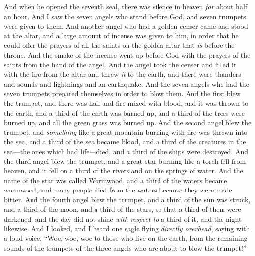 \begin{biblechapter} %
 And when he opened the seventh seal, there was silence in heaven \textit{for} about half an hour.
\verse And I saw the seven angels who stand before God, and seven trumpets were given to them.
\verse And another angel who had a golden censer came and stood at the altar, and a large amount of incense was given to him, in order that he could offer the prayers of all the saints on the golden altar that \textit{is} before the throne.
\verse And the smoke of the incense went up before God with the prayers of the saints from the hand of the angel.
\verse And the angel took the censer and filled it with the fire from the altar and threw \textit{it} to the earth, and there were thunders and sounds and lightnings and an earthquake.
 And the seven angels who had the seven trumpets prepared themselves in order to blow them.
\verse And the first blew the trumpet, and there was hail and fire mixed with blood, and it was thrown to the earth, and a third of the earth was burned up, and a third of the trees were burned up, and all the green grass was burned up.
\verse And the second angel blew the trumpet, and \textit{something} like a great mountain burning with fire was thrown into the sea, and a third of the sea became blood,
\verse and a third of the creatures in the sea—the ones which had life—died, and a third of the ships were destroyed.
\verse And the third angel blew the trumpet, and a great star burning like a torch fell from heaven, and it fell on a third of the rivers and on the springs of water.
\verse And the name of the star was called Wormwood, and a third of the waters became wormwood, and many people died from the waters because they were made bitter.
\verse And the fourth angel blew the trumpet, and a third of the sun was struck, and a third of the moon, and a third of the stars, so that a third of them were darkened, and the day did not shine \textit{with respect to} a third of it, and the night likewise.
\verse And I looked, and I heard one eagle flying \textit{directly overhead}, saying with a loud voice, “Woe, woe, woe to those who live on the earth, from the remaining sounds of the trumpets of the three angels who are about to blow the trumpet!”
\end{biblechapter}

